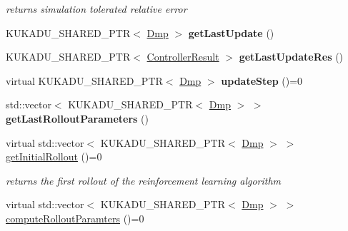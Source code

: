 \begin{DoxyCompactItemize}
\begin{DoxyCompactList}\small\item\em returns simulation tolerated relative error \end{DoxyCompactList}\item 
K\+U\+K\+A\+D\+U\+\_\+\+S\+H\+A\+R\+E\+D\+\_\+\+P\+TR$<$ \hyperlink{classkukadu_1_1Dmp}{Dmp} $>$ {\bfseries get\+Last\+Update} ()\hypertarget{classkukadu_1_1DMPReinforcer_abab6e2bd6abdd613335ecc7186e3d89c}{}\label{classkukadu_1_1DMPReinforcer_abab6e2bd6abdd613335ecc7186e3d89c}

\item 
K\+U\+K\+A\+D\+U\+\_\+\+S\+H\+A\+R\+E\+D\+\_\+\+P\+TR$<$ \hyperlink{classkukadu_1_1ControllerResult}{Controller\+Result} $>$ {\bfseries get\+Last\+Update\+Res} ()\hypertarget{classkukadu_1_1DMPReinforcer_aa8722bbe4c69ca344c82a2e5aaa85d74}{}\label{classkukadu_1_1DMPReinforcer_aa8722bbe4c69ca344c82a2e5aaa85d74}

\item 
virtual K\+U\+K\+A\+D\+U\+\_\+\+S\+H\+A\+R\+E\+D\+\_\+\+P\+TR$<$ \hyperlink{classkukadu_1_1Dmp}{Dmp} $>$ {\bfseries update\+Step} ()=0\hypertarget{classkukadu_1_1DMPReinforcer_af88dad66482a357f0c4bcfc94aeac631}{}\label{classkukadu_1_1DMPReinforcer_af88dad66482a357f0c4bcfc94aeac631}

\item 
std\+::vector$<$ K\+U\+K\+A\+D\+U\+\_\+\+S\+H\+A\+R\+E\+D\+\_\+\+P\+TR$<$ \hyperlink{classkukadu_1_1Dmp}{Dmp} $>$ $>$ {\bfseries get\+Last\+Rollout\+Parameters} ()\hypertarget{classkukadu_1_1DMPReinforcer_ad4032a5137fd6ff47b09455361e2ebe3}{}\label{classkukadu_1_1DMPReinforcer_ad4032a5137fd6ff47b09455361e2ebe3}

\item 
virtual std\+::vector$<$ K\+U\+K\+A\+D\+U\+\_\+\+S\+H\+A\+R\+E\+D\+\_\+\+P\+TR$<$ \hyperlink{classkukadu_1_1Dmp}{Dmp} $>$ $>$ \hyperlink{classkukadu_1_1DMPReinforcer_a32bac8a17c007d40673b05f34ee017ca}{get\+Initial\+Rollout} ()=0\hypertarget{classkukadu_1_1DMPReinforcer_a32bac8a17c007d40673b05f34ee017ca}{}\label{classkukadu_1_1DMPReinforcer_a32bac8a17c007d40673b05f34ee017ca}

\begin{DoxyCompactList}\small\item\em returns the first rollout of the reinforcement learning algorithm \end{DoxyCompactList}\item 
virtual std\+::vector$<$ K\+U\+K\+A\+D\+U\+\_\+\+S\+H\+A\+R\+E\+D\+\_\+\+P\+TR$<$ \hyperlink{classkukadu_1_1Dmp}{Dmp} $>$ $>$ \hyperlink{classkukadu_1_1DMPReinforcer_abf1b944f57802f5ea3470be9746ad5ab}{compute\+Rollout\+Paramters} ()=0\hypertarget{classkukadu_1_1DMPReinforcer_abf1b944f57802f5ea3470be9746ad5ab}{}\label{classkukadu_1_1DMPReinforcer_abf1b944f57802f5ea3470be9746ad5ab}


\end{DoxyCompactItemize}
